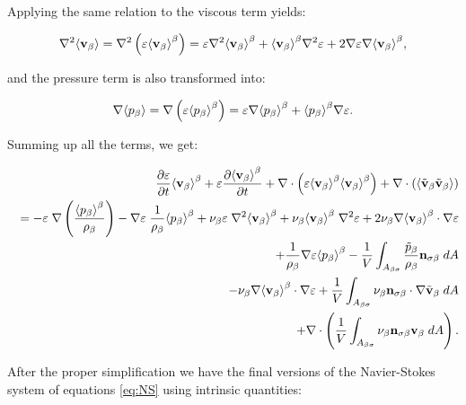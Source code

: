 Applying the same relation to the viscous term yields:

\begin{equation}
	\nabla^2 \means{\vb} = \nabla^2 \left( \varepsilon \meani{\vb} \right) = \varepsilon \nabla^2 \meani{\vb} + \meani{\vb} \nabla^2 \varepsilon +2 \nabla \varepsilon \nabla \meani{\vb},
\end{equation}

and the pressure term is also transformed into:

\begin{equation}
\nabla \means{\pb} = \nabla \left( \varepsilon \meani{\pb} \right) = \varepsilon \nabla \meani{\pb} + \meani{\pb} \nabla \varepsilon.
\end{equation}

Summing up all the terms, we get:

\begin{eqnarray}
&& \derp{\varepsilon}{t}\meani{\vb} + \varepsilon \derp{\meani{\vb}}{t} + \nabla \cdot \left(\varepsilon \meani{\vb}\meani{\vb}\right)   + \nabla \cdot \left(\means{\vbt \vbt}\right)  \nonumber \\
&&= -\varepsilon \; \nabla \left(\dfrac{\meani{\pb}}{\rho_{\beta}}\right) - \nabla \varepsilon \; \dfrac{1}{\rho_{\beta}} \meani{\pb}  + \nub \varepsilon \; \nabla^2 \meani{\vb} + \nub \meani{\vb} \; \nabla^2 \varepsilon + 2 \nub  \nabla \meani{\vb} \cdot \nabla \varepsilon \nonumber \\
&&+\dfrac{1}{\rho_{\beta}}\nabla\varepsilon \meani{\pb} - \dfrac{1}{V} \int_{A_{\beta \sigma}} \dfrac{\pbt}{\rho_{\beta}} \nbs \;dA \nonumber \\
&&- \nub \nabla \meani{\vb} \cdot \nabla \varepsilon + \dfrac{1}{V} \int_{A_{\beta \sigma}} \nub  \nbs  \cdot  \nabla \vbt \;dA \nonumber \\
&& + \nabla \cdot \left( \dfrac{1}{V} \int_{A_{\beta \sigma}}  \nub \nbs \vb  \;dA \right).
\end{eqnarray}

After the proper simplification we have the final versions of the Navier-Stokes system of equations \eqref{eq:NS} using intrinsic quantities:

